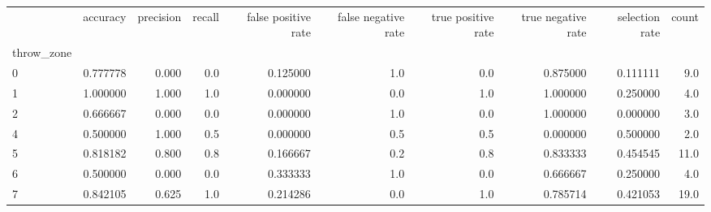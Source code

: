 \begin{tabular}{lrrrrrrrrr}
\toprule
{} &  accuracy &  precision &  recall &  false positive rate &  false negative rate &  true positive rate &  true negative rate &  selection rate &  count \\
throw\_zone &           &            &         &                      &                      &                     &                     &                 &        \\
\midrule
0          &  0.777778 &      0.000 &     0.0 &             0.125000 &                  1.0 &                 0.0 &            0.875000 &        0.111111 &    9.0 \\
1          &  1.000000 &      1.000 &     1.0 &             0.000000 &                  0.0 &                 1.0 &            1.000000 &        0.250000 &    4.0 \\
2          &  0.666667 &      0.000 &     0.0 &             0.000000 &                  1.0 &                 0.0 &            1.000000 &        0.000000 &    3.0 \\
4          &  0.500000 &      1.000 &     0.5 &             0.000000 &                  0.5 &                 0.5 &            0.000000 &        0.500000 &    2.0 \\
5          &  0.818182 &      0.800 &     0.8 &             0.166667 &                  0.2 &                 0.8 &            0.833333 &        0.454545 &   11.0 \\
6          &  0.500000 &      0.000 &     0.0 &             0.333333 &                  1.0 &                 0.0 &            0.666667 &        0.250000 &    4.0 \\
7          &  0.842105 &      0.625 &     1.0 &             0.214286 &                  0.0 &                 1.0 &            0.785714 &        0.421053 &   19.0 \\
\bottomrule
\end{tabular}
